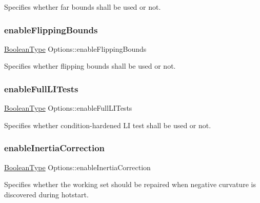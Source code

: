 Specifies whether far bounds shall be used or not. \mbox{\label{class_options_abba3f3ece76237c647b5719eae9c26f2}} 
\subsubsection{\texorpdfstring{enable\+Flipping\+Bounds}{enableFlippingBounds}}
{\footnotesize\ttfamily \hyperlink{_types_8hpp_a20f82124c82b6f5686a7fce454ef9089}{Boolean\+Type} Options\+::enable\+Flipping\+Bounds}

Specifies whether flipping bounds shall be used or not. \mbox{\label{class_options_a043d6f962a785e05d304950d01461432}} 
\subsubsection{\texorpdfstring{enable\+Full\+L\+I\+Tests}{enableFullLITests}}
{\footnotesize\ttfamily \hyperlink{_types_8hpp_a20f82124c82b6f5686a7fce454ef9089}{Boolean\+Type} Options\+::enable\+Full\+L\+I\+Tests}

Specifies whether condition-\/hardened LI test shall be used or not. \mbox{\label{class_options_a52d5f55b5fb0b5ddd52cd8069d3ce477}} 
\subsubsection{\texorpdfstring{enable\+Inertia\+Correction}{enableInertiaCorrection}}
{\footnotesize\ttfamily \hyperlink{_types_8hpp_a20f82124c82b6f5686a7fce454ef9089}{Boolean\+Type} Options\+::enable\+Inertia\+Correction}

Specifies whether the working set should be repaired when negative curvature is discovered during hotstart. \mbox{\label{class_options_aeec0473a768989b1a2f587f51709636a}} 
